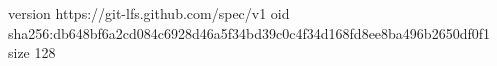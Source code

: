 version https://git-lfs.github.com/spec/v1
oid sha256:db648bf6a2cd084c6928d46a5f34bd39c0c4f34d168fd8ee8ba496b2650df0f1
size 128
